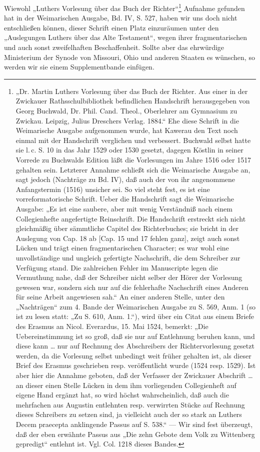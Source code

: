Wiewohl „Luthers Vorlesung über das Buch der Richter“\footnote{„Dr. Martin Luthers Vorlesung über das Buch der Richter. Aus einer in der Zwickauer Rathsschulbibliothek befindlichen Handschrift herausgegeben von Georg Buchwald, Dr. Phil. Cand. Theol., Oberlehrer am Gymnasium zu Zwickau. Leipzig, Julius Dreschers Verlag. 1884.“ Ehe diese Schrift in die Weimarische Ausgabe aufgenommen wurde, hat Kawerau den Text noch einmal mit der Handschrift verglichen und verbessert. Buchwald selbst hatte sie l.\,c. S. 10 in das Jahr 1529 oder 1530 gesetzt, dagegen Köstlin in seiner Vorrede zu Buchwalds Edition läßt die Vorlesungen im Jahre 1516 oder 1517 gehalten sein. Letzterer Annahme schließt sich die Weimarische Ausgabe an, sagt jedoch (Nachträge zu Bd. IV), daß auch der von ihr angenommene Anfangstermin (1516) unsicher sei. So viel steht fest, es ist eine vorreformatorische Schrift. Ueber die Handschrift sagt die Weimarische Ausgabe: „Es ist eine saubere, aber mit wenig Verständniß nach einem Collegienhefte angefertigte Reinschrift. Die Handschrift erstreckt sich nicht gleichmäßig über sämmtliche Capitel des Richterbuches; sie bricht in der Auslegung von Cap. 18 ab [Cap. 15 und 17 fehlen ganz], zeigt auch sonst Lücken und trägt einen fragmentarischen Character; es war wohl eine unvollständige und ungleich gefertigte Nachschrift, die dem Schreiber zur Verfügung stand. Die zahlreichen Fehler im Manuscripte legen die Vermuthung nahe, daß der Schreiber nicht selber der Hörer der Vorlesung gewesen war, sondern sich nur auf die fehlerhafte Nachschrift eines Anderen für seine Arbeit angewiesen sah.“ An einer anderen Stelle, unter den „Nachträgen“ zum 4. Bande der Weimarischen Ausgabe zu S. 569, Anm. 1 (so ist zu lesen statt: „Zu S. 610, Anm. 1.“), wird über ein Citat aus einem Briefe des Erasmus an Nicol. Everardus, 15. Mai 1524, bemerkt: „Die Uebereinstimmung ist so groß, daß sie nur auf Entlehnung beruhen kann, und diese kann … nur auf Rechnung des Abschreibers der Richtervorlesung gesetzt werden, da die Vorlesung selbst unbedingt weit früher gehalten ist, als dieser Brief des Erasmus geschrieben resp. veröffentlicht wurde (1524 resp. 1529). Ist aber hier die Annahme geboten, daß der Verfasser der Zwickauer Abschrift … an dieser einen Stelle Lücken in dem ihm vorliegenden Collegienheft auf eigene Hand ergänzt hat, so wird höchst wahrscheinlich, daß auch die mehrfachen aus Augustin entlehnten resp. verwirrten Stücke auf Rechnung dieses Schreibers zu setzen sind, ja vielleicht auch der so stark an Luthers Decem praecepta anklingende Passus auf S. 538.“ — Wir sind fest überzeugt, daß der eben erwähnte Passus aus „Die zehn Gebote dem Volk zu Wittenberg gepredigt“ entlehnt ist. Vgl. Col. 1218 dieses Bandes.} Aufnahme gefunden hat in der Weimarischen Ausgabe, Bd. IV, S. 527, haben wir uns doch nicht entschließen können, dieser Schrift einen Platz einzuräumen unter den „Auslegungen Luthers über das Alte Testament“, wegen ihrer fragmentarischen und auch sonst zweifelhaften Beschaffenheit. Sollte aber das ehrwürdige Ministerium der Synode von Missouri, Ohio und anderen Staaten es wünschen, so werden wir sie einem Supplementbande einfügen.

